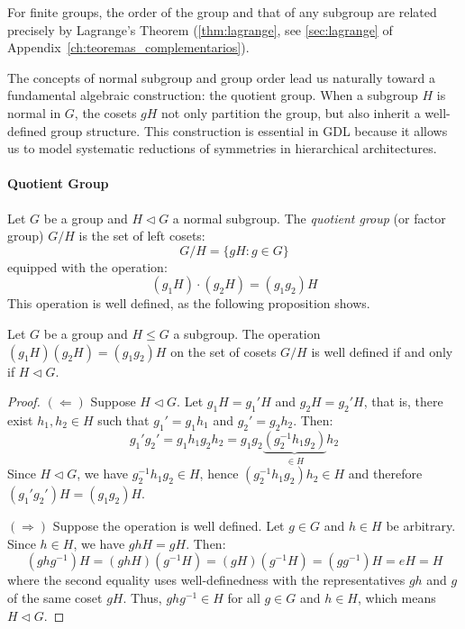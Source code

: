For finite groups, the order of the group and that of any subgroup are related precisely by Lagrange's Theorem (\autoref{thm:lagrange}, see \autoref{sec:lagrange} of Appendix~\ref{ch:teoremas_complementarios}).

The concepts of normal subgroup and group order lead us naturally toward a fundamental algebraic construction: the quotient group. When a subgroup $H$ is normal in $G$, the cosets $gH$ not only partition the group, but also inherit a well-defined group structure. This construction is essential in \gls{GDL} because it allows us to model systematic reductions of symmetries in hierarchical architectures.

\paragraph{Quotient Group}

\begin{definition}\label{def:grupo_cociente}
Let $G$ be a group and $H \triangleleft G$ a normal subgroup. The \textit{quotient group} (or factor group) $G/H$ is the set of left cosets:
\begin{equation}
G/H = \{gH : g \in G\}
\end{equation}
equipped with the operation:
\begin{equation}
(g_1H) \cdot (g_2H) = (g_1g_2)H
\end{equation}
This operation is well defined, as the following proposition shows.
\end{definition}

\begin{proposition}\label{prop:cociente_bien_definido}
Let $G$ be a group and $H \leq G$ a subgroup. The operation $(g_1H)(g_2H) = (g_1g_2)H$ on the set of cosets $G/H$ is well defined if and only if $H \triangleleft G$.
\end{proposition}

\begin{proof}
$(\Leftarrow)$ Suppose $H \triangleleft G$. Let $g_1H = g_1'H$ and $g_2H = g_2'H$, that is, there exist $h_1, h_2 \in H$ such that $g_1' = g_1h_1$ and $g_2' = g_2h_2$. Then:
\[
g_1'g_2' = g_1h_1g_2h_2 = g_1g_2\underbrace{(g_2^{-1}h_1g_2)}_{\in H}h_2
\]
Since $H \triangleleft G$, we have $g_2^{-1}h_1g_2 \in H$, hence $(g_2^{-1}h_1g_2)h_2 \in H$ and therefore $(g_1'g_2')H = (g_1g_2)H$.

$(\Rightarrow)$ Suppose the operation is well defined. Let $g \in G$ and $h \in H$ be arbitrary. Since $h \in H$, we have $ghH = gH$. Then:
\[
(ghg^{-1})H = (ghH)(g^{-1}H) = (gH)(g^{-1}H) = (gg^{-1})H = eH = H
\]
where the second equality uses well-definedness with the representatives $gh$ and $g$ of the same coset $gH$. Thus, $ghg^{-1} \in H$ for all $g \in G$ and $h \in H$, which means $H \triangleleft G$.
\end{proof}

